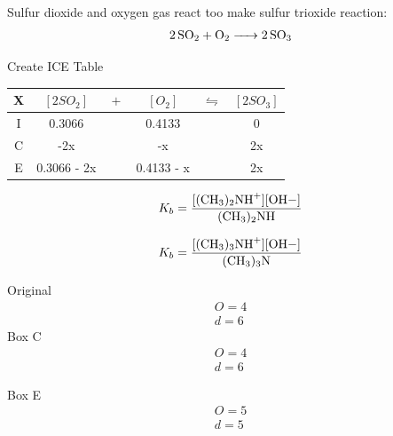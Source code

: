 \documentclass{article}  %
\begin{document}
Sulfur dioxide and oxygen gas react too make sulfur trioxide reaction:
\begin{equation*}
    \begin{aligned}
        \ce{2SO2 + O2 -> 2SO3}
    \end{aligned}
\end{equation*}

Create ICE Table \\
\begin{tabular}{c|c@{}c@{}c@{}c@{}c}
    \hline
    X   &   $[2SO_2]$ & ${}+{}$ & $[O_2]$ & ${}\leftrightharpoons{}$ & $[2SO_3]$ \\
    \hline
    I   &       0.3066       &&   0.4133        &&  0       \\
    C   &       -2x      &&   -x        &&  2x      \\
    E   &       0.3066 - 2x     &&   0.4133 - x        &&  2x      \\
    \hline
\end{tabular}

\begin{equation*}
    \begin{aligned}
        K_b = \ce{\frac{[(CH3)2NH^+][OH-]}{(CH3)2NH}}
    \end{aligned}
\end{equation*}

\begin{equation*}
    \begin{aligned}
        K_b = \ce{\frac{[(CH3)3NH+][OH-]}{(CH3)3N}}
    \end{aligned}
\end{equation*}

Original
\begin{equation*}
    \begin{aligned}
        O = 4 \\
        d = 6 
    \end{aligned}
\end{equation*}
Box C
\begin{equation*}
    \begin{aligned}
        O = 4 \\
        d = 6 
    \end{aligned}
\end{equation*}

Box E
\begin{equation*}
    \begin{aligned}
        O = 5 \\
        d = 5 
    \end{aligned}
\end{equation*}
\end{document}
